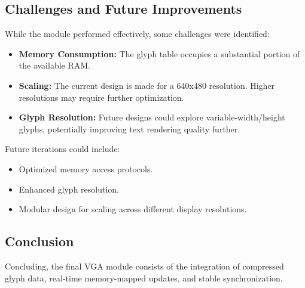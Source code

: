 \documentclass{subfile}
\begin{document}
\subsection{Challenges and Future Improvements}
While the module performed effectively, some challenges were identified:
\begin{itemize}
    \item \textbf{Memory Consumption:} The glyph table occupies a substantial portion of the available RAM. 
    \item \textbf{Scaling:} The current design is made for a 640x480 resolution. Higher resolutions may require further optimization.
    \item \textbf{Glyph Resolution:} Future designs could explore variable-width/height glyphs, potentially improving text rendering quality further.
\end{itemize}

Future iterations could include:
\begin{itemize}
    \item Optimized memory access protocols.
    \item Enhanced glyph resolution.
    \item Modular design for scaling across different display resolutions.
\end{itemize}

\subsection{Conclusion}
Concluding, the final VGA module consists of the integration of compressed glyph data, real-time memory-mapped updates, and stable synchronization. 
\end{document}
